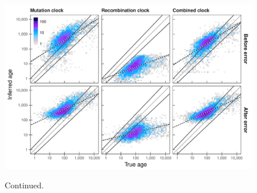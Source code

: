 

\begin{figure}[tb]
\ContinuedFloat
{\small{}} \\
\includegraphics[width=\textwidth]{./img/ch5/generror_scat_dgt}
\caption[]{Continued.}
\label{fig:generror_scat_dgt}
\end{figure}
